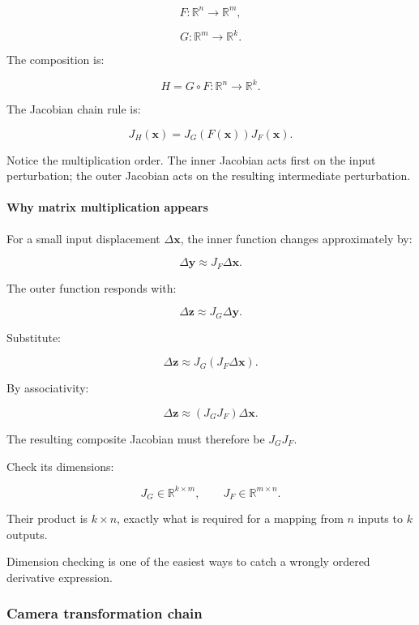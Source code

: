 \[
F:\mathbb R^n\rightarrow\mathbb R^m,
\]

\[
G:\mathbb R^m\rightarrow\mathbb R^k.
\]

The composition is:

\[
H=G\circ F:\mathbb R^n\rightarrow\mathbb R^k.
\]

The Jacobian chain rule is:

\[
\boxed{ J_H(\mathbf x) = J_G(F(\mathbf x))J_F(\mathbf x) }.
\]

Notice the multiplication order. The inner Jacobian acts first on the input perturbation; the outer Jacobian acts on the resulting intermediate perturbation.

\paragraph{Why matrix multiplication appears}\label{02-foundations-ii-ch021-why-matrix-multiplication-appears}

\hypertarget{02-foundations-ii-ch021-why-matrix-multiplication-appears}{}

For a small input displacement \(\Delta\mathbf x\), the inner function changes approximately by:

\[
\Delta\mathbf y\approx J_F\Delta\mathbf x.
\]

The outer function responds with:

\[
\Delta\mathbf z\approx J_G\Delta\mathbf y.
\]

Substitute:

\[
\Delta\mathbf z \approx J_G(J_F\Delta\mathbf x).
\]

By associativity:

\[
\boxed{ \Delta\mathbf z \approx(J_GJ_F)\Delta\mathbf x }.
\]

The resulting composite Jacobian must therefore be \(J_GJ_F\).

Check its dimensions:

\[
J_G\in\mathbb R^{k\times m}, \qquad J_F\in\mathbb R^{m\times n}.
\]

Their product is \(k\times n\), exactly what is required for a mapping from \(n\) inputs to \(k\) outputs.

Dimension checking is one of the easiest ways to catch a wrongly ordered derivative expression.

\subsubsection{Camera transformation chain}\label{02-foundations-ii-ch021-camera-transformation-chain}

